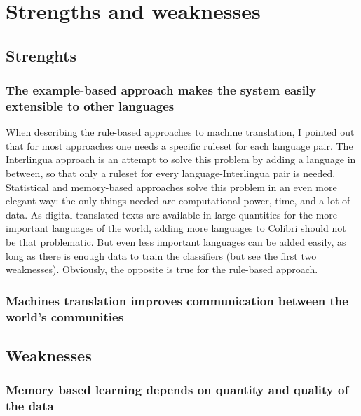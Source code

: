 \documentclass[12pt]{article}
\begin{document}
\section{Strengths and weaknesses}

\subsection{Strenghts}

\subsubsection{The example-based approach makes the system easily extensible to other languages}

When describing the rule-based approaches to machine translation, I pointed out that for most approaches one needs a specific ruleset for each language pair. The Interlingua approach is an attempt to solve this problem by adding a language in between, so that only a ruleset for every language-Interlingua pair is needed. Statistical and memory-based approaches solve this problem in an even more elegant way: the only things needed are computational power, time, and a lot of data. As digital translated texts are available in large quantities for the more important languages of the world, adding more languages to Colibri should not be that problematic. But even less important languages can be added easily, as long as there is enough data to train the classifiers (but see the first two weaknesses). Obviously, the opposite is true for the rule-based approach.

\subsubsection{Machines translation improves communication between the world's communities}

\subsection{Weaknesses}

\subsubsection{Memory based learning depends on quantity and quality of the data}
\end{document}
